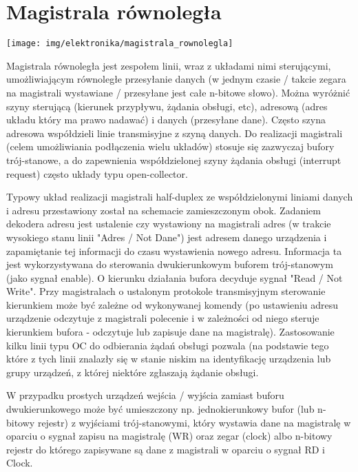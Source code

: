 \section{Magistrala równoległa}

\begin{center}
    \texttt{[image: img/elektronika/magistrala\_rownolegla]}
\end{center}
Magistrala równoległa jest zespołem linii, wraz z układami nimi sterującymi, umożliwiającym równoległe przesyłanie danych (w jednym czasie / takcie zegara na magistrali wystawiane / przesyłane jest całe n-bitowe słowo).
Można wyróżnić szyny sterującą (kierunek przypływu, żądania obsługi, etc), adresową (adres układu który ma prawo nadawać) i danych (przesyłane dane). Często szyna adresowa współdzieli linie transmisyjne z szyną danych.
Do realizacji magistrali (celem umożliwiania podłączenia wielu układów) stosuje się zazwyczaj bufory trój-stanowe, a do zapewnienia współdzielonej szyny żądania obsługi (interrupt request) często układy typu open-collector.

Typowy układ realizacji magistrali half-duplex ze współdzielonymi liniami danych i adresu przestawiony został na schemacie zamieszczonym obok.
Zadaniem dekodera adresu jest ustalenie czy wystawiony na magistrali adres (w trakcie wysokiego stanu linii "Adres / Not Dane") jest adresem danego urządzenia i zapamiętanie tej informacji do czasu wystawienia nowego adresu. Informacja ta jest wykorzystywana do sterowania dwukierunkowym buforem trój-stanowym (jako sygnał enable).
O kierunku działania bufora decyduje sygnał "Read / Not Write". Przy magistralach o ustalonym protokole transmisyjnym sterowanie kierunkiem może być zależne od wykonywanej komendy (po ustawieniu adresu urządzenie odczytuje z magistrali polecenie i w zależności od niego steruje kierunkiem bufora - odczytuje lub zapisuje dane na magistralę).
Zastosowanie kilku linii typu OC do odbierania żądań obsługi pozwala (na podstawie tego które z tych linii znalazły się w stanie niskim na identyfikację urządzenia lub grupy urządzeń, z której niektóre zgłaszają żądanie obsługi.

W przypadku prostych urządzeń wejścia / wyjścia zamiast buforu dwukierunkowego może być umieszczony np.
jednokierunkowy bufor (lub n-bitowy rejestr) z wyjściami trój-stanowymi, który wystawia dane na magistralę w oparciu o sygnał zapisu na magistralę (WR) oraz zegar (clock) albo
n-bitowy rejestr do którego zapisywane są dane z magistrali w oparciu o sygnał RD i Clock.

